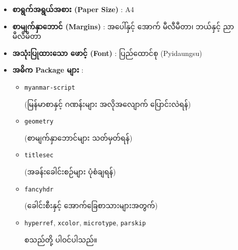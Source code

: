 \documentclass[11pt, a4paper, openany]{book} %
\begin{document}
\begin{itemize}
    \renewcommand{\labelitemi}{\textcolor{accentcolor}{\textbf{--}}}
    
    \item \begin{myanmar}\textbf{စာရွက်အရွယ်အစား (Paper Size)} : A4\end{myanmar}
    \vspace{0.5em}
    
    \item \begin{myanmar}\textbf{စာမျက်နှာဘောင် (Margins)} : အပေါ်နှင့် အောက်  မီလီမီတာ၊ ဘယ်နှင့် ညာ  မီလီမီတာ\end{myanmar}
    \vspace{0.5em}
    
    \item \begin{myanmar}\textbf{အသုံးပြုထားသော ဖောင့် (Font)} : ပြည်ထောင်စု (Pyidaungsu)\end{myanmar}
    \vspace{0.5em}
    
    \item \begin{myanmar}\textbf{အဓိက Package များ} : \end{myanmar}
    \begin{itemize}
      \renewcommand{\labelitemii}{\textcolor{brandcolor}{$\circ$}}
      \item \texttt{myanmar-script} \begin{myanmar}(မြန်မာစာနှင့် ဂဏန်းများ အလိုအလျောက် ပြောင်းလဲရန်)\end{myanmar}
      \item \texttt{geometry} \begin{myanmar}(စာမျက်နှာဘောင်များ သတ်မှတ်ရန်)\end{myanmar}
      \item \texttt{titlesec} \begin{myanmar}(အခန်းခေါင်းစဉ်များ ပုံစံချရန်)\end{myanmar}
      \item \texttt{fancyhdr} \begin{myanmar}(ခေါင်းစီးနှင့် အောက်ခြေစာသားများအတွက်)\end{myanmar}
      \item \texttt{hyperref}, \texttt{xcolor}, \texttt{microtype}, \texttt{parskip} \begin{myanmar}စသည်တို့ ပါဝင်ပါသည်။\end{myanmar}
    \end{itemize}
\end{itemize}
\end{document}
